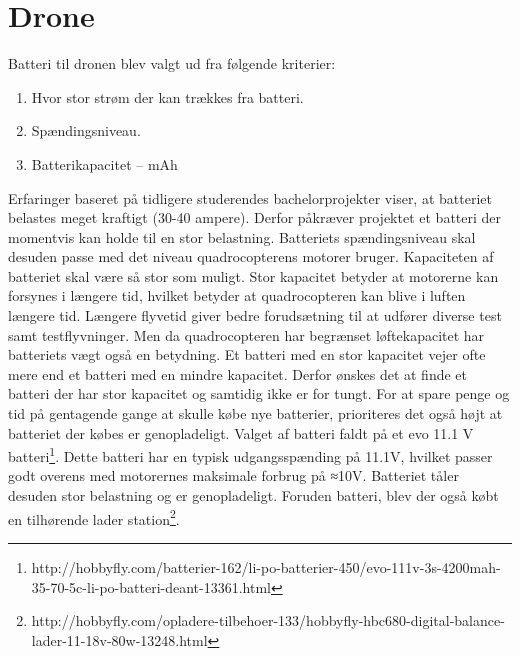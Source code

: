 \section{Drone}

Batteri til dronen blev valgt ud fra følgende kriterier:

\begin{enumerate}[label*=\arabic*.]
	\item Hvor stor strøm der kan trækkes fra batteri.
	\item Spændingsniveau. 
	\item Batterikapacitet – mAh
\end{enumerate}

Erfaringer baseret på tidligere studerendes bachelorprojekter viser, at batteriet belastes meget kraftigt  (30-40 ampere). Derfor påkræver projektet et batteri der momentvis kan holde til en stor belastning. Batteriets spændingsniveau skal desuden passe med det niveau quadrocopterens motorer bruger. 
Kapaciteten af batteriet skal være så stor som muligt. Stor kapacitet betyder at motorerne kan forsynes i længere tid, hvilket betyder at quadrocopteren kan blive i luften længere tid. Længere flyvetid giver bedre forudsætning til at udfører diverse test samt testflyvninger. 
Men da quadrocopteren har begrænset løftekapacitet har batteriets vægt også en betydning. Et batteri med en stor kapacitet vejer ofte mere end et batteri med en mindre kapacitet. Derfor ønskes det at finde et batteri der har stor kapacitet og samtidig ikke er for tungt.  
For at spare penge og tid på gentagende gange at skulle købe nye batterier, prioriteres det også højt at batteriet der købes er genopladeligt. 
Valget af batteri faldt på et evo 11.1 V batteri\footnote{http://hobbyfly.com/batterier-162/li-po-batterier-450/evo-111v-3s-4200mah-35-70-5c-li-po-batteri-deant-13361.html}.   Dette batteri har en typisk udgangsspænding på 11.1V, hvilket passer godt overens med motorernes maksimale forbrug på ≈10V. Batteriet tåler desuden stor belastning og er genopladeligt. Foruden batteri, blev der også købt en tilhørende lader station\footnote{http://hobbyfly.com/opladere-tilbehoer-133/hobbyfly-hbc680-digital-balance-lader-11-18v-80w-13248.html}.

